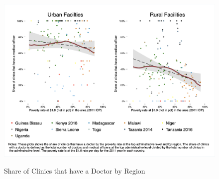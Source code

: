 \documentclass{article}                 %
\begin{document}
			\begin{figure}[H] 
				\centering
				\caption{Share of Clinics that have a Doctor by Region} 
						\includegraphics[width=\textwidth]{"../Output/Final/Poverty_medone_region"}
						\label{doc_reg}
			\end{figure}
	
	
\end{document}
